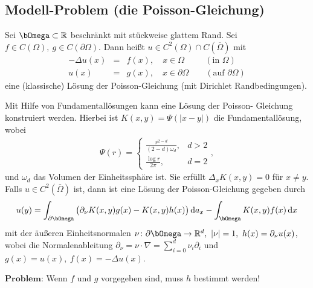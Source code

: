 \subsection{Modell-Problem (die Poisson-Gleichung)}


\begin{Definition}
\label{def:1.1}
    Sei $\Omega\subset \R$ beschränkt mit stückweise glattem Rand. Sei
    $f\in C(\Omega), \ g\in C(\partial\Omega)$. Dann hei\ss t $u\in C^2(\Omega)
    \cap C(\overline\Omega)$ mit
    \begin{eqnarray*}
          -\Delta u(x)
        &=& f(x), \quad x\in \Omega \qquad \ \ (\text{in } \Omega) \\
            u(x)
        &=& g(x), \quad x\in \partial\Omega \qquad (\text{auf } \partial\Omega)
    \end{eqnarray*}
    eine (klassische) Lösung der Poisson-Gleichung (mit Dirichlet
    Randbedingungen).
\end{Definition}


\begin{Beispiel}
    Mit Hilfe von Fundamentallösungen kann eine Lösung der Poisson-
    Gleichung konstruiert werden. Hierbei ist $K(x,y) = \Psi(|x-y|)$ die
    Fundamentallösung, wobei
    \begin{eqnarray*}
        \Psi(r) = \begin{cases}
                      \frac{r^{2-d}}{(2-d)\omega_d}, 	& d>2 \\
                      \frac{\log{r}}{2\pi}, 		& d=2
                  \end{cases},
    \end{eqnarray*}
    und $\omega_d$ das Volumen der Einheitssphäre ist. Sie erfüllt
    $\Delta_x K(x,y) = 0$ für $x\neq y$. Falls $u\in C^2(\overline\Omega)$
    ist, dann ist eine Lösung der Poisson-Gleichung gegeben durch
    \begin{eqnarray*}
          u(y)
        = \int_{\partial \Omega} \big(\partial_\nu K(x,y) g(x) - K(x,y) h(x) \big) \da_x
          -\int_\Omega K(x,y) f(x) \dx
    \end{eqnarray*}
    mit der äu\ss{}eren Einheitsnormalen $\nu\colon \partial\Omega \to
    \R^d, \ |\nu| = 1, \ h(x) = \partial_\nu u(x)$, wobei die Normalenableitung
    $\partial_\nu = \nu\cdot\nabla = \sum_{i=0}^d \nu_i \partial_i$ und
    $g(x) = u(x), \ f(x) = -\Delta u(x)$.

    $\textbf{Problem:}$ Wenn $f$ und $g$ vorgegeben sind, muss $h$ bestimmt
    werden!
\end{Beispiel}


